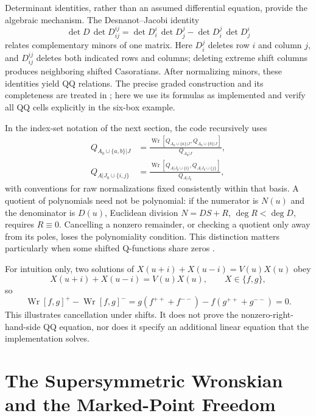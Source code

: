 \documentclass[11pt]{article}
\newcommand{\Wron}{\operatorname{Wr}}
\begin{document}
Determinant identities, rather than an assumed differential equation,
provide the algebraic mechanism. The Desnanot--Jacobi identity
\[
 \det D\,\det D_{ij}^{ij}
 =\det D_i^i\,\det D_j^j-\det D_i^j\,\det D_j^i
\]
relates complementary minors of one matrix. Here $D_i^j$ deletes row
$i$ and column $j$, and $D_{ij}^{ij}$ deletes both indicated rows and
columns; deleting extreme shift
columns produces neighboring shifted Casoratians. After normalizing
minors, these identities yield QQ relations. The precise graded
construction and its completeness are treated in
\cite{chervolin}; here we use its formulas as implemented and verify
all QQ cells explicitly in the six-box example.

In the index-set notation of the next section, the code recursively uses
\begin{align}
 \label{eq:reduction-bos}
 Q_{A_0\cup\{a,b\}|J}
 &=\frac{\Wron[Q_{A_0\cup\{a\}|J},Q_{A_0\cup\{b\}|J}]}{Q_{A_0|J}},\\
 \label{eq:reduction-ferm}
 Q_{A|J_0\cup\{i,j\}}
 &=\frac{\Wron[Q_{A|J_0\cup\{i\}},Q_{A|J_0\cup\{j\}}]}{Q_{A|J_0}},
\end{align}
with conventions for raw normalizations fixed consistently within that
basis. A quotient of polynomials need not be polynomial: if the
numerator is $N(u)$ and the denominator is $D(u)$, Euclidean division
$N=DS+R$, $\deg R<\deg D$, requires $R\equiv0$. Cancelling a nonzero
remainder, or checking a quotient only away from its poles, loses the
polynomiality condition. This distinction matters particularly when
some shifted Q-functions share zeros \cite{marboevolin}.

For intuition only, two solutions of
$X(u+i)+X(u-i)=V(u)X(u)$ obey
\begin{equation}
 \label{eq:baxter-toy}
 X(u+i)+X(u-i)=V(u)X(u),\qquad X\in\{f,g\},
\end{equation}
so
\begin{equation}
 \label{eq:wronskian-conservation}
 \Wron[f,g]^+-\Wron[f,g]^-
 =g(f^{++}+f^{--})-f(g^{++}+g^{--})=0.
\end{equation}
This illustrates cancellation under shifts. It does not prove the
nonzero-right-hand-side QQ equation, nor does it specify an additional
linear equation that the implementation solves.

\section{The Supersymmetric Wronskian and the Marked-Point Freedom}
\label{sec:susy}
\end{document}
